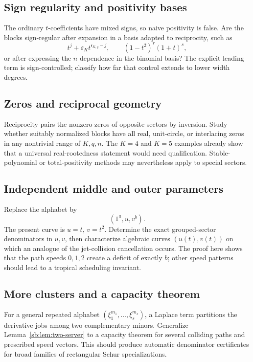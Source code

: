\documentclass[11pt]{article}
\theoremstyle{definition}
\theoremstyle{remark}
\newcommand{\rdeg}{\mathsf r}
\newcommand{\epsK}{\varepsilon}
\theoremstyle{definition}
\theoremstyle{plain}
\numberwithin{equation}{section}
\begin{document}
\subsection{Sign regularity and positivity bases}
\label{sb:q:sign}
The ordinary $t$-coefficients have mixed signs, so naive positivity is false.
Are the blocks sign-regular after expansion in a basis adapted to reciprocity,
such as
\[
 t^j+\epsK_K t^{\rdeg_{K,q}-j},
 \qquad
 (1-t^2)^r(1+t)^s,
\]
or after expressing the $n$ dependence in the binomial basis?  The explicit
leading term is sign-controlled; classify how far that control extends to
lower width degrees.

\subsection{Zeros and reciprocal geometry}
\label{sb:q:zeros}
Reciprocity pairs the nonzero zeros of opposite sectors by inversion.  Study
whether suitably normalized blocks have all real, unit-circle, or
interlacing zeros in any nontrivial range of $K,q,n$.  The $K=4$ and $K=5$
examples already show that a universal real-rootedness statement would need
qualification.  Stable-polynomial or total-positivity methods may nevertheless
apply to special sectors.

\subsection{Independent middle and outer parameters}
\label{sb:q:parameters}
Replace the alphabet by
\[
 (1^a,u,v^b).
\]
The present curve is $u=t$, $v=t^2$.  Determine the exact grouped-sector
denominators in $u,v$, then characterize algebraic curves $(u(t),v(t))$ on
which an analogue of the jet-collision cancellation occurs.  The proof here
shows that the path speeds $0,1,2$ create a deficit of exactly $b$; other speed
patterns should lead to a tropical scheduling invariant.

\subsection{More clusters and a capacity theorem}
\label{sb:q:clusters}
For a general repeated alphabet
$(\xi_1^{m_1},\ldots,\xi_s^{m_s})$, a Laplace term partitions the derivative
jobs among two complementary minors.  Generalize Lemma~\ref{sb:lem:two-server} to a
capacity theorem for several colliding paths and prescribed speed vectors.
This should produce automatic denominator certificates for broad families of
rectangular Schur specializations.
\end{document}
